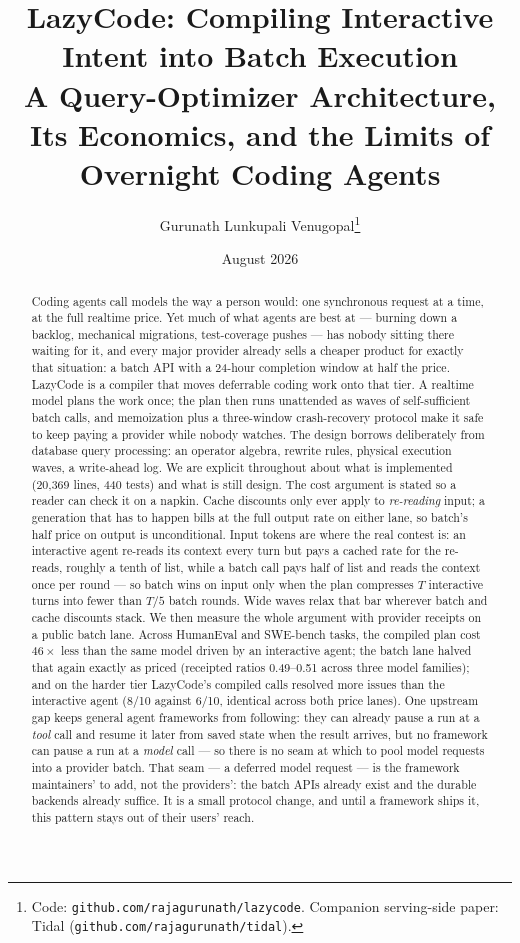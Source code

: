 \documentclass[11pt]{article}
\title{\textbf{LazyCode: Compiling Interactive Intent into Batch Execution}\\
\large A Query-Optimizer Architecture, Its Economics, and the Limits of Overnight Coding Agents}
\author{Gurunath Lunkupali Venugopal\thanks{Code: \texttt{github.com/rajagurunath/lazycode}. Companion serving-side paper: Tidal (\texttt{github.com/rajagurunath/tidal}).}}
\date{August 2026}
\begin{document}
\maketitle

\begin{abstract}
Coding agents call models the way a person would: one synchronous request at a time, at the full realtime price. Yet much of what agents are best at --- burning down a backlog, mechanical migrations, test-coverage pushes --- has nobody sitting there waiting for it, and every major provider already sells a cheaper product for exactly that situation: a batch API with a 24-hour completion window at half the price. LazyCode is a compiler that moves deferrable coding work onto that tier. A realtime model plans the work once; the plan then runs unattended as waves of self-sufficient batch calls, and memoization plus a three-window crash-recovery protocol make it safe to keep paying a provider while nobody watches. The design borrows deliberately from database query processing: an operator algebra, rewrite rules, physical execution waves, a write-ahead log. We are explicit throughout about what is implemented (20{,}369 lines, 440 tests) and what is still design. The cost argument is stated so a reader can check it on a napkin. Cache discounts only ever apply to \emph{re-reading} input; a generation that has to happen bills at the full output rate on either lane, so batch's half price on output is unconditional. Input tokens are where the real contest is: an interactive agent re-reads its context every turn but pays a cached rate for the re-reads, roughly a tenth of list, while a batch call pays half of list and reads the context once per round --- so batch wins on input only when the plan compresses $T$ interactive turns into fewer than $T/5$ batch rounds. Wide waves relax that bar wherever batch and cache discounts stack. We then measure the whole argument with provider receipts on a public batch lane. Across HumanEval and SWE-bench tasks, the compiled plan cost $46\times$ less than the same model driven by an interactive agent; the batch lane halved that again exactly as priced (receipted ratios 0.49--0.51 across three model families); and on the harder tier LazyCode's compiled calls resolved more issues than the interactive agent (8/10 against 6/10, identical across both price lanes). One upstream gap keeps general agent frameworks from following: they can already pause a run at a \emph{tool} call and resume it later from saved state when the result arrives, but no framework can pause a run at a \emph{model} call --- so there is no seam at which to pool model requests into a provider batch. That seam --- a deferred model request --- is the framework maintainers' to add, not the providers': the batch APIs already exist and the durable backends already suffice. It is a small protocol change, and until a framework ships it, this pattern stays out of their users' reach.
\end{abstract}
\end{document}
